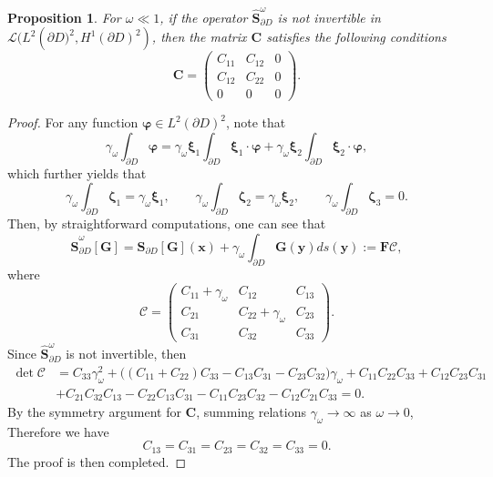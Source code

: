 \documentclass[10pt,reqno,oneside]{amsart}%
\newtheorem{prop}{Proposition}[section]
\theoremstyle{definition}
\theoremstyle{remark}
\numberwithin{equation}{section}
\numberwithin{equation}{section}
\begin{document}
\begin{prop}\label{matrixC}
For $\omega\ll1$, if the operator $\hat{\mathbf{S}}_{\partial D}^{\omega}$ is not invertible in $\mathcal{L}(L^{2}\left(\partial D)^{2},H^{1}(\partial D)^{2}\right)$, then the matrix $\mathbf{C}$ satisfies the following conditions%
$$
\mathbf{C}=
\begin{pmatrix}
C_{11} &  C_{12} & 0\\
C_{12} &  C_{22} & 0\\
0 &  0 & 0
\end{pmatrix}.
$$
\end{prop}
\begin{proof}
For any function $\boldsymbol{\varphi} \in L^{2}(\partial D)^{2}$, note that
$$
\gamma_{\omega}\int_{\partial D}\boldsymbol{\varphi}=\gamma_{\omega}\boldsymbol{\xi}_1\int_{\partial D}\boldsymbol{\xi}_1\cdot\boldsymbol{\varphi}
+\gamma_{\omega}\boldsymbol{\xi}_2\int_{\partial D}\boldsymbol{\xi}_2\cdot\boldsymbol{\varphi},
$$
which further yields that
$$
\gamma_{\omega}\int_{\partial D}\boldsymbol{\zeta}_1=\gamma_{\omega}\boldsymbol{\xi}_1, \quad\quad \gamma_{\omega}\int_{\partial D}\boldsymbol{\zeta}_2=\gamma_{\omega}\boldsymbol{\xi}_2,\quad \quad\gamma_{\omega}\int_{\partial D}\boldsymbol{\zeta}_3=0.
$$
Then, by straightforward computations, one can see that
$$
\hat{\mathbf{S}}_{\partial D}^{\omega}[\mathbf{G}]=\mathbf{S}_{\partial D}[\mathbf{G}](\mathbf{x})+\gamma_{\omega}\int_{\partial D}\mathbf{G}(\mathbf{y})d s(\mathbf{y}):=\mathbf{F}\mathscr{C},
$$
where
$$
\mathscr{C}=
\begin{pmatrix}
C_{11}+\gamma_{\omega} &  C_{12} & C_{13}\\
C_{21} &  C_{22}+\gamma_{\omega} & C_{23}\\
C_{31} &  C_{32} & C_{33}
\end{pmatrix}.
$$
Since $\hat{\mathbf{S}}_{\partial D}^{\omega}$ is not invertible, then
\begin{align}
\det\mathscr{C}&=C_{33}\gamma_{\omega}^2+\Big((C_{11}+C_{22})C_{33}-C_{13}C_{31}-C_{23}C_{32}\Big)\gamma_{\omega}+C_{11}C_{22}C_{33}+C_{12}C_{23}C_{31}\nonumber\\
&+C_{21}C_{32}C_{13}-C_{22}C_{13}C_{31}-C_{11}C_{23}C_{32}-C_{12}C_{21}C_{33}=0.\nonumber
\end{align}
By the symmetry argument for $\mathbf{C}$, summing relations $\gamma_{\omega}\rightarrow\infty$ as $\omega\rightarrow0$, Therefore we have
$$
C_{13}=C_{31}=C_{23}=C_{32}=C_{33}=0.
$$
The proof is then completed.
\end{proof}
\end{document}
